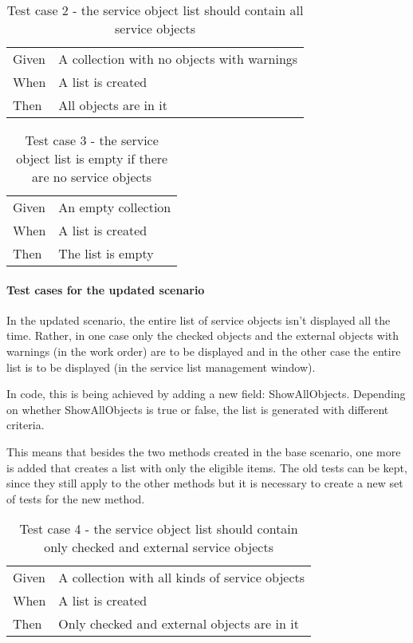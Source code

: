 \documentclass{article}
\begin{document}
				\begin{table}[h!]
					\centering
					\begin{tabular}{|p{1cm} p{7cm} |}
					\hline
					Given 	& A collection with no objects with warnings\\ 
					When 	& A list is created  \\	
					Then 	& All objects are in it \\
					\hline
					\end{tabular}
					\caption{Test case 2 - the service object list should contain all service objects}
				\end{table}


				\begin{table}[h!]
					\centering
					\begin{tabular}{|p{1cm} p{7cm} |}
					\hline
					Given 	& An empty collection \\ 
					When 	& A list is created  \\	
					Then 	& The list is empty \\
					\hline
					\end{tabular}
					\caption{Test case 3 - the service object list is empty if there are no service objects}
				\end{table}

				\paragraph{Test cases for the updated scenario}
				In the updated scenario, the entire list of service objects isn't displayed all the time. Rather, in one case only the checked objects and the external objects with warnings (in the work order) are to be displayed and in the other case the entire list is to be displayed (in the service list management window).

				In code, this is being achieved by adding a new field: ShowAllObjects. Depending on whether ShowAllObjects is true or false, the list is generated with different criteria.
				
				This means that besides the two methods created in the base scenario, one more is added that creates a list with only the eligible items. The old tests can be kept, since they still apply to the other methods but it is necessary to create a new set of tests for the new method.

					\begin{table}[h!]
					\centering
					\begin{tabular}{|p{1cm} p{7cm} |}
					\hline
					Given 	& A collection with all kinds of service objects \\ 
					When 	& A list is created  \\	
					Then 	& Only checked and external objects are in it \\
					\hline
					\end{tabular}
					\caption{Test case 4 - the service object list should contain only checked and external service objects}
				\end{table}
\end{document}
